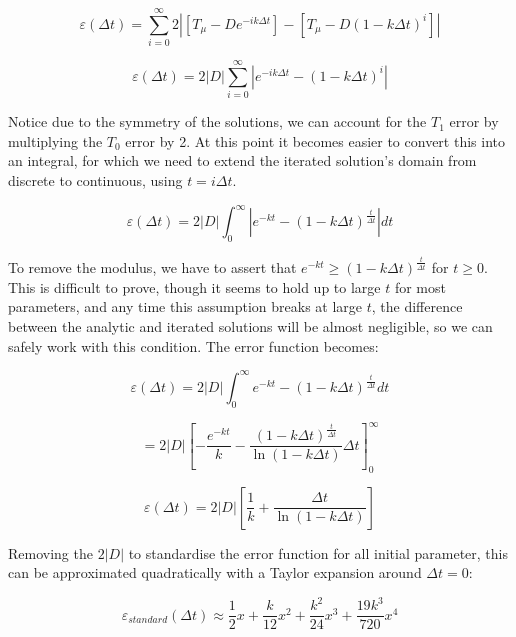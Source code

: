 \documentclass{article}
\begin{document}
\begin{equation*}
    \varepsilon(\Delta t) = \sum_{i=0}^{\infty} 2\left|[T_\mu -De^{-ik\Delta t}]-[T_\mu-D(1-k\Delta t )^i]\right|
\end{equation*}

\begin{equation*}
    \varepsilon(\Delta t) = 2|D|\sum_{i=0}^{\infty} \left|e^{-ik\Delta t}-(1-k\Delta t)^i\right|
\end{equation*}

Notice due to the symmetry of the solutions, we can account for the $T_1$ error by multiplying the $T_0$ error by 2. At this point it becomes easier to convert this into an integral, for which we need to extend the iterated solution's domain from discrete to continuous, using $t=i\Delta t$. 

\begin{equation*}
    \varepsilon(\Delta t) = 2|D|\int_{0}^{\infty} \left|e^{-kt}-(1-k\Delta t)^{\frac{t}{\Delta t}} \right| dt
\end{equation*}

To remove the modulus, we have to assert that $e^{-kt}\geq (1-k\Delta t)^{\frac{t}{\Delta t}}$ for $t\geq0$. This is difficult to prove, though it seems to hold up to large $t$ for most parameters, and any time this assumption breaks at large $t$, the difference between the analytic and iterated solutions will be almost negligible, so we can safely work with this condition. The error function becomes:

\begin{equation*}
    \varepsilon(\Delta t) = 2|D|\int_{0}^{\infty} e^{-kt}-(1-k\Delta t)^{\frac{t}{\Delta t}} dt
\end{equation*}

\begin{equation*}
    = 2|D|\left[ -\frac{e^{-kt}}{k}-\frac{(1-k\Delta t)^{\frac{t}{\Delta t}}}{\ln(1-k\Delta t)}\Delta t \right]_0^\infty
\end{equation*}

\begin{equation}
    \varepsilon(\Delta t) = 2|D|\left[ \frac{1}{k}+\frac{\Delta t}{\ln(1-k\Delta t)} \right]
\end{equation}

Removing the $2|D|$ to standardise the error function for all initial parameter, this can be approximated quadratically with a Taylor expansion around $\Delta t = 0$:

\begin{equation}
    \varepsilon_{standard}(\Delta t) \approx \frac{1}{2}x+\frac{k}{12}x^2+\frac{k^2}{24}x^3 + \frac{19k^3}{720}x^4
\end{equation}
\end{document}
